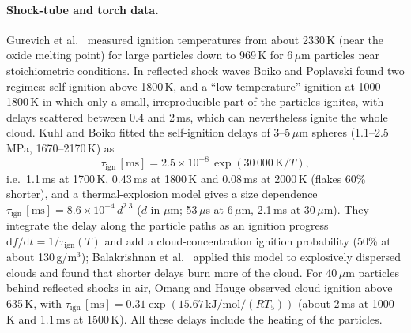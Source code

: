 \documentclass{article}
\begin{document}
\paragraph{Shock-tube and torch data.} Gurevich et al.\ \cite{gurevich1970} measured ignition temperatures from about 2330\,K (near the oxide melting point) for large particles down to 969\,K for 6\,$\mu$m particles near stoichiometric conditions. In reflected shock waves Boiko and Poplavski \cite{boiko2002} found two regimes: self-ignition above 1800\,K, and a ``low-temperature'' ignition at 1000--1800\,K in which only a small, irreproducible part of the particles ignites, with delays scattered between 0.4 and 2\,ms, which can nevertheless ignite the whole cloud. Kuhl and Boiko \cite{kuhlboiko2010} fitted the self-ignition delays of 3--5\,$\mu$m spheres (1.1--2.5\,MPa, 1670--2170\,K) as
\begin{equation}
    \tau_\text{ign}\,[\text{ms}] = 2.5\times10^{-8}\,\exp(30\,000\,\text{K}/T),
    \label{eq:kuhlboiko}
\end{equation}
i.e.\ 1.1\,ms at 1700\,K, 0.43\,ms at 1800\,K and 0.08\,ms at 2000\,K (flakes 60\% shorter), and a thermal-explosion model gives a size dependence $\tau_\text{ign}\,[\text{ms}] = 8.6\times10^{-4}\,d^{2.3}$ ($d$ in $\mu$m; 53\,$\mu$s at 6\,$\mu$m, 2.1\,ms at 30\,$\mu$m). They integrate the delay along the particle paths as an ignition progress $\mathrm{d}f/\mathrm{d}t = 1/\tau_\text{ign}(T)$ and add a cloud-concentration ignition probability (50\% at about 130\,g/m$^3$); Balakrishnan et al.\ \cite{balakrishnan2012} applied this model to explosively dispersed clouds and found that shorter delays burn more of the cloud. For 40\,$\mu$m particles behind reflected shocks in air, Omang and Hauge \cite{omang2022} observed cloud ignition above 635\,K, with $\tau_\text{ign}\,[\text{ms}] = 0.31\exp(15.67\,\text{kJ/mol}/(R T_5))$ (about 2\,ms at 1000\,K and 1.1\,ms at 1500\,K). All these delays include the heating of the particles.
\end{document}
